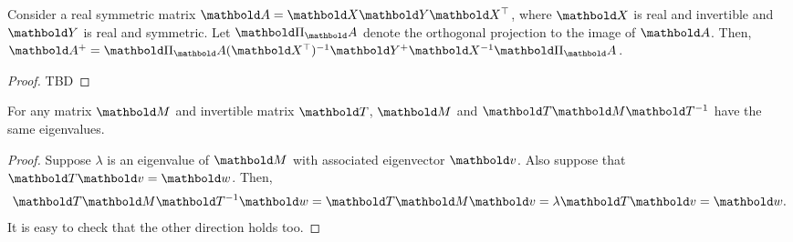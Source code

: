 \begin{lem}\label{lem:a6}
Consider a real symmetric matrix $\mA = \mX\mY\trans{\mX}$, where $\mX$ is real and invertible and $\mY$ is real and symmetric. Let $\mPi_\mA$ denote the orthogonal projection to the image of $\mA$. Then, $\pinv{\mA} = \mPi_\mA\inv{(\trans{\mX})}\pinv{\mY}\inv{\mX}\mPi_\mA$.
\end{lem}
\begin{proof} TBD
\end{proof}

\begin{lem}\label{lem:a7} For any matrix $\mM$ and invertible matrix $\mT$, $\mM$ and $\mT\mM\inv{\mT}$ have the same eigenvalues.
\end{lem}
\begin{proof}
Suppose $\lambda$ is an eigenvalue of $\mM$ with associated eigenvector $\vv$. Also suppose that $\mT\vv = \vw$. Then, \begin{align*}
    \mT\mM\inv{\mT}\vw = \mT\mM\vv = \lambda\mT\vv = \vw.
\end{align*} It is easy to check that the other direction holds too.
\end{proof}